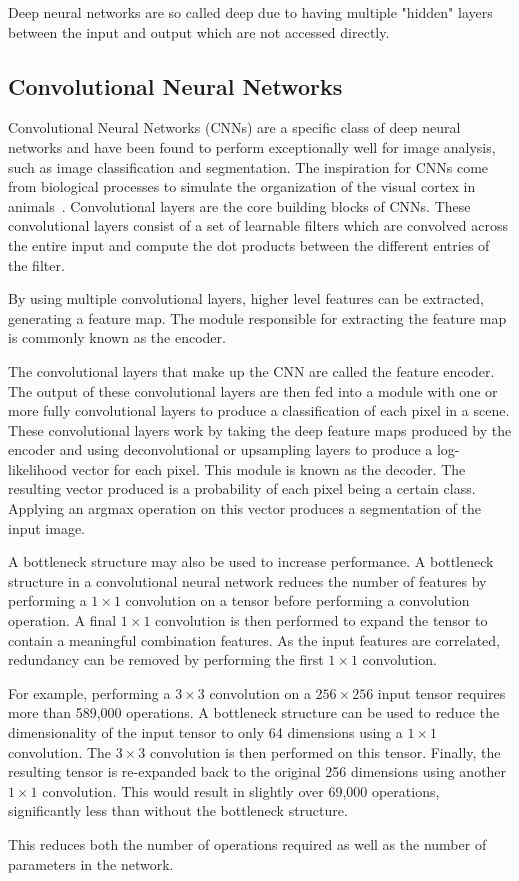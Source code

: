 Deep neural networks are so called deep due to having multiple "hidden" layers between the input and output which are not accessed directly.

\subsection{Convolutional Neural Networks}\label{section:background-cnn}
Convolutional Neural Networks (CNNs) are a specific class of deep neural networks and have been found to perform exceptionally well for image analysis, such as image classification and segmentation.
The inspiration for CNNs come from biological processes to simulate the organization of the visual cortex in animals~\cite{cnnbiology}.
Convolutional layers are the core building blocks of CNNs.
These convolutional layers consist of a set of learnable filters which are convolved across the entire input and compute the dot products between the different entries of the filter.



By using multiple convolutional layers, higher level features can be extracted, generating a feature map.
The module responsible for extracting the feature map is commonly known as the encoder.

The convolutional layers that make up the CNN are called the feature encoder.
The output of these convolutional layers are then fed into a module with one or more fully convolutional layers to produce a classification of each pixel in a scene.
These convolutional layers work by taking the deep feature maps produced by the encoder and using deconvolutional or upsampling layers to produce a log-likelihood vector for each pixel.
This module is known as the decoder.
The resulting vector produced is a probability of each pixel being a certain class.
Applying an argmax operation on this vector produces a segmentation of the input image.

A bottleneck structure may also be used to increase performance.
A bottleneck structure in a convolutional neural network reduces the number of features by performing a $1 \times 1$ convolution on a tensor before performing a convolution operation.
A final $1 \times 1$ convolution is then performed to expand the tensor to contain a meaningful combination features.
As the input features are correlated, redundancy can be removed by performing the first $1 \times 1$ convolution.

For example, performing a $3 \times 3$ convolution on a $256 \times 256$ input tensor requires more than 589,000 operations.
A bottleneck structure can be used to reduce the dimensionality of the input tensor to only 64 dimensions using a $1 \times 1$ convolution.
The $3 \times 3$ convolution is then performed on this tensor.
Finally, the resulting tensor is re-expanded back to the original 256 dimensions using another $1 \times 1$ convolution.
This would result in slightly over 69,000 operations, significantly less than without the bottleneck structure.

This reduces both the number of operations required as well as the number of parameters in the network.